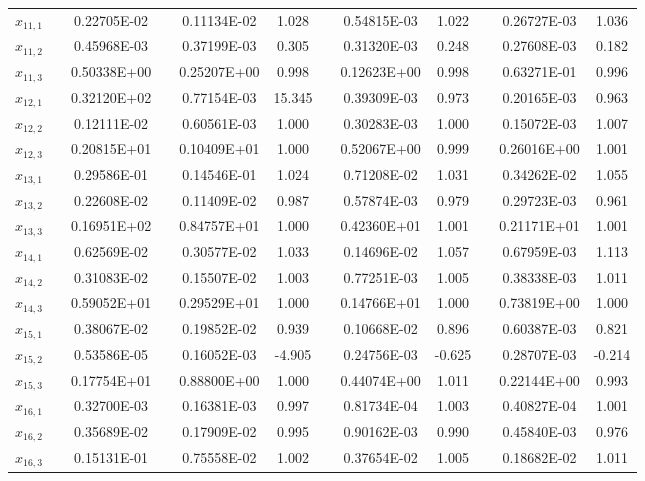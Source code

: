 \begin{table}[t]
\begin{center}
\begin{tabular}{ @{}cccc  cccc  cccc @{} }
$ x_{11,1}$  && 0.22705E-02 &&  0.11134E-02 &   1.028  && 0.54815E-03 &   1.022 && 0.26727E-03  &   1.036 \\
$ x_{11,2}$  && 0.45968E-03 &&  0.37199E-03 &   0.305  && 0.31320E-03 &   0.248 && 0.27608E-03  &   0.182 \\
$ x_{11,3}$  && 0.50338E+00 &&  0.25207E+00 &   0.998  && 0.12623E+00 &   0.998 && 0.63271E-01  &   0.996 \\
$ x_{12,1}$  && 0.32120E+02 &&  0.77154E-03 &  15.345  && 0.39309E-03 &   0.973 && 0.20165E-03  &   0.963 \\
$ x_{12,2}$  && 0.12111E-02 &&  0.60561E-03 &   1.000  && 0.30283E-03 &   1.000 && 0.15072E-03  &   1.007 \\
$ x_{12,3}$  && 0.20815E+01 &&  0.10409E+01 &   1.000  && 0.52067E+00 &   0.999 && 0.26016E+00  &   1.001 \\
$ x_{13,1}$  && 0.29586E-01 &&  0.14546E-01 &   1.024  && 0.71208E-02 &   1.031 && 0.34262E-02  &   1.055 \\
$ x_{13,2}$  && 0.22608E-02 &&  0.11409E-02 &   0.987  && 0.57874E-03 &   0.979 && 0.29723E-03  &   0.961 \\
$ x_{13,3}$  && 0.16951E+02 &&  0.84757E+01 &   1.000  && 0.42360E+01 &   1.001 && 0.21171E+01  &   1.001 \\
$ x_{14,1}$  && 0.62569E-02 &&  0.30577E-02 &   1.033  && 0.14696E-02 &   1.057 && 0.67959E-03  &   1.113 \\
$ x_{14,2}$  && 0.31083E-02 &&  0.15507E-02 &   1.003  && 0.77251E-03 &   1.005 && 0.38338E-03  &   1.011 \\
$ x_{14,3}$  && 0.59052E+01 &&  0.29529E+01 &   1.000  && 0.14766E+01 &   1.000 && 0.73819E+00  &   1.000 \\
$ x_{15,1}$  && 0.38067E-02 &&  0.19852E-02 &   0.939  && 0.10668E-02 &   0.896 && 0.60387E-03  &   0.821 \\
$ x_{15,2}$  && 0.53586E-05 &&  0.16052E-03 &  -4.905  && 0.24756E-03 &  -0.625 && 0.28707E-03  &  -0.214 \\
$ x_{15,3}$  && 0.17754E+01 &&  0.88800E+00 &   1.000  && 0.44074E+00 &   1.011 && 0.22144E+00  &   0.993 \\
$ x_{16,1}$  && 0.32700E-03 &&  0.16381E-03 &   0.997  && 0.81734E-04 &   1.003 && 0.40827E-04  &   1.001 \\
$ x_{16,2}$  && 0.35689E-02 &&  0.17909E-02 &   0.995  && 0.90162E-03 &   0.990 && 0.45840E-03  &   0.976 \\
$ x_{16,3}$  && 0.15131E-01 &&  0.75558E-02 &   1.002  && 0.37654E-02 &   1.005 && 0.18682E-02  &   1.011 \\

\end{tabular}
\end{center}
\end{table}
